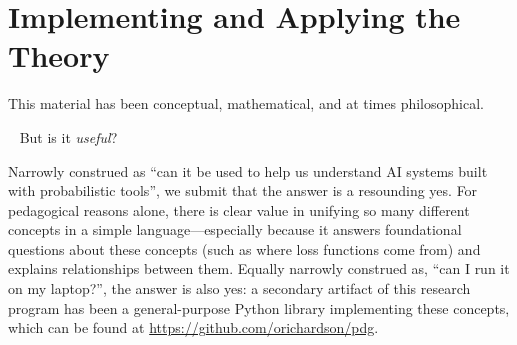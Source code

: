 \section{Implementing and Applying the Theory}

This material has been conceptual, mathematical, and at times philosophical.
{\par~\hfil
But is it \emph{useful}?
\hfil\par}

Narrowly construed as ``can it be used to help us understand AI systems built with probabilistic tools'', we submit that the answer is a resounding yes. 
For pedagogical reasons alone, there is clear value in unifying so many different concepts 
in a simple language---especially 
    because it answers foundational questions about these concepts (such as where loss functions come from) and explains relationships between them.
Equally narrowly construed as, ``can I run it on my laptop?'', the answer is also yes:
\commentout{%
}%
a secondary artifact of this research program has been a general-purpose Python library implementing these concepts, which can be found at
    {\small\url{https://github.com/orichardson/pdg}}.
